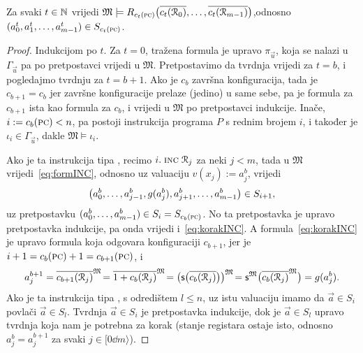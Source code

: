 \begin{lema}[{name=[izračunavanje čuva istinitost formula pojedinih konfiguracija]}]\label{lm:formcomputesteps}
Za svaki $t\in{\mathbb N}$ vrijedi $\mathfrak M\models R_{c_t(\textsc{pc})}\bigl(\overline{c_t(\mathcal R_{0})},\dotsc,\overline{c_t(\mathcal R_{m-1})}\bigr)$,\newline odnosno $(a_0^t,a_1^t,\dotsc,a_{m-1}^t)\in S_{c_t(\textsc{pc})}$.
\end{lema}
\begin{proof}
Indukcijom po $t$. Za $t=0$, tražena formula je upravo $\pi_{\vec u}$, koja se nalazi u $\Gamma_{\vec u}$ pa po pretpostavci vrijedi u $\mathfrak M$. Pretpostavimo da tvrdnja vrijedi za $t=b$, i pogledajmo tvrdnju za $t=b+1$. Ako je $c_b$ završna konfiguracija, tada je $c_{b+1}=c_b$ jer završne konfiguracije prelaze (jedino) u same sebe, pa je formula za $c_{b+1}$ ista kao formula za $c_b$, i vrijedi u $\mathfrak M$ po pretpostavci indukcije. Inače, $i:=c_b(\textsc{pc})<n$, pa postoji instrukcija programa $P$ s rednim brojem $i$, i također je $\iota_i\in\Gamma_{\vec u}$, dakle $\mathfrak M\models\iota_i$.

Ako je ta instrukcija tipa \inc, recimo $i.\;\textsc{inc}\;\mathcal R_{j}$ za neki $j<m$, tada u $\mathfrak M$ vrijedi~\eqref{eq:formINC}, odnosno uz valuaciju $v(x_j):=a_j^b$, vrijedi
\begin{equation}
\label{eq:korakINC}
	\bigl(a_0^b,\dotsc,a_{j-1}^b,g(a_j^b),a_{j+1}^b,\dotsc,a_{m-1}^b\bigr)\in S_{i+1}\text,
\end{equation} uz pretpostavku $(a_0^b,\dotsc,a_{m-1}^b)\in S_i=S_{c_b(\textsc{pc})}$. No ta pretpostavka je upravo pretpostavka indukcije, pa onda vrijedi i~\eqref{eq:korakINC}. A formula~\eqref{eq:korakINC} je upravo formula koja odgovara konfiguraciji $c_{b+1}$, jer je $i+1=c_b(\textsc{pc})+1=c_{b+1}(\textsc{pc})$, i
\begin{equation}
	a_j^{b+1}=\overline{c_{b+1}(\mathcal R_{j})}^{\mathfrak M}\!=\overline{1+c_b(\mathcal R_{j})}^{\mathfrak M}\!=\bigl(\mathsf s\bigl(\overline{c_b(\mathcal R_{j})}\bigr)\bigr)^{\mathfrak M}\!=\mathsf s^{\mathfrak M}\bigl(\overline{c_b(\mathcal R_{j})}^{\mathfrak M}\bigr)=g(a_j^b)\text.
\end{equation}
	Ako je ta instrukcija tipa \goto, s odredištem $l\le n$, uz istu valuaciju imamo da $\vec a\in S_i$ povlači $\vec a\in S_l$. Tvrdnja $\vec a\in S_i$ je pretpostavka indukcije, dok je $\vec a\in S_l$ upravo tvrdnja koja nam je potrebna za korak (stanje registara ostaje isto, odnosno $a_j^b=a_j^{b+1}$ za svaki $j\in[0\dd m\rangle$).


\end{proof}
